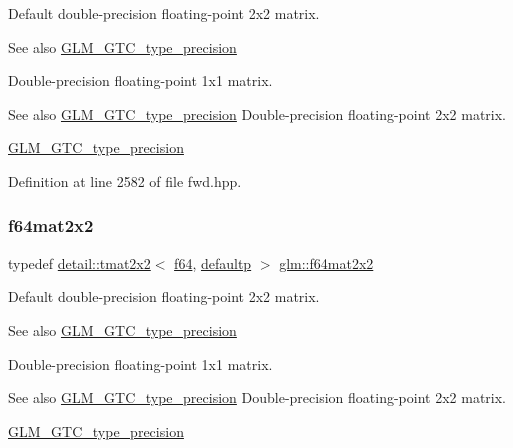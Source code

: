 Default double-\/precision floating-\/point 2x2 matrix. \begin{DoxySeeAlso}{See also}
\hyperlink{group__gtc__type__precision}{G\+L\+M\+\_\+\+G\+T\+C\+\_\+type\+\_\+precision}
\end{DoxySeeAlso}
Double-\/precision floating-\/point 1x1 matrix. \begin{DoxySeeAlso}{See also}
\hyperlink{group__gtc__type__precision}{G\+L\+M\+\_\+\+G\+T\+C\+\_\+type\+\_\+precision} Double-\/precision floating-\/point 2x2 matrix. 

\hyperlink{group__gtc__type__precision}{G\+L\+M\+\_\+\+G\+T\+C\+\_\+type\+\_\+precision} 
\end{DoxySeeAlso}


Definition at line 2582 of file fwd.\+hpp.

\mbox{\label{group__gtc__type__precision_gad125d405392e76f26f359798350fb64f}} 
\subsubsection{\texorpdfstring{f64mat2x2}{f64mat2x2}}
{\footnotesize\ttfamily typedef \hyperlink{structglm_1_1detail_1_1tmat2x2}{detail\+::tmat2x2}$<$ \hyperlink{group__gtc__type__precision_ga2bba392e555124b36cde6abba349bab3}{f64}, \hyperlink{namespaceglm_a0f04f086094c747d227af4425893f545a9d21ccd8b5a009ec7eb7677befc3bf51}{defaultp} $>$ \hyperlink{group__gtc__type__precision_gad125d405392e76f26f359798350fb64f}{glm\+::f64mat2x2}}

Default double-\/precision floating-\/point 2x2 matrix. \begin{DoxySeeAlso}{See also}
\hyperlink{group__gtc__type__precision}{G\+L\+M\+\_\+\+G\+T\+C\+\_\+type\+\_\+precision}
\end{DoxySeeAlso}
Double-\/precision floating-\/point 1x1 matrix. \begin{DoxySeeAlso}{See also}
\hyperlink{group__gtc__type__precision}{G\+L\+M\+\_\+\+G\+T\+C\+\_\+type\+\_\+precision} Double-\/precision floating-\/point 2x2 matrix. 

\hyperlink{group__gtc__type__precision}{G\+L\+M\+\_\+\+G\+T\+C\+\_\+type\+\_\+precision} 
\end{DoxySeeAlso}


